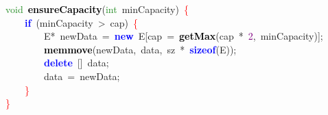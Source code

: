 \documentclass[table, usenames,dvipsnames,svgnames]{beamer}
\begin{document}
\begin{frame}
\pause
\vspace{-4mm}
\begin{center}\begin{minipage}{90mm}
\begin{block}
\noindent
\mbox{}\ \ \ \ \textcolor{ForestGreen}{void}\ \textbf{\textcolor{Black}{ensureCapacity}}\textcolor{BrickRed}{(}\textcolor{ForestGreen}{int}\ minCapacity\textcolor{BrickRed}{)}\ \textcolor{Red}{\{}\  \\
\mbox{}\ \ \ \ \ \ \ \ \textbf{\textcolor{Blue}{if}}\ \textcolor{BrickRed}{(}minCapacity\ \textcolor{BrickRed}{\textgreater{}}\ cap\textcolor{BrickRed}{)}\ \textcolor{Red}{\{} \\
\mbox{}\ \ \ \ \ \ \ \ \ \ \ \ E\textcolor{BrickRed}{*}\ newData\ \textcolor{BrickRed}{=}\ \textbf{\textcolor{Blue}{new}}\ E\textcolor{BrickRed}{[}cap\ \textcolor{BrickRed}{=}\ \textbf{\textcolor{Black}{getMax}}\textcolor{BrickRed}{(}cap\ \textcolor{BrickRed}{*}\ \textcolor{Purple}{2}\textcolor{BrickRed}{,}\ minCapacity\textcolor{BrickRed}{)];} \\
\mbox{}\ \ \ \ \ \ \ \ \ \ \ \ \textbf{\textcolor{Black}{memmove}}\textcolor{BrickRed}{(}newData\textcolor{BrickRed}{,}\ data\textcolor{BrickRed}{,}\ sz\ \textcolor{BrickRed}{*}\ \textbf{\textcolor{Blue}{sizeof}}\textcolor{BrickRed}{(}E\textcolor{BrickRed}{));} \\
\mbox{}\ \ \ \ \ \ \ \ \ \ \ \ \textbf{\textcolor{Blue}{delete}}\ \textcolor{BrickRed}{[]}\ data\textcolor{BrickRed}{;} \\
\mbox{}\ \ \ \ \ \ \ \ \ \ \ \ data\ \textcolor{BrickRed}{=}\ newData\textcolor{BrickRed}{;} \\
\mbox{}\ \ \ \ \ \ \ \ \textcolor{Red}{\}} \\
\mbox{}\ \ \ \ \textcolor{Red}{\}}
\end{block}
\end{minipage}\end{center}
    
\end{frame}
\end{document}
